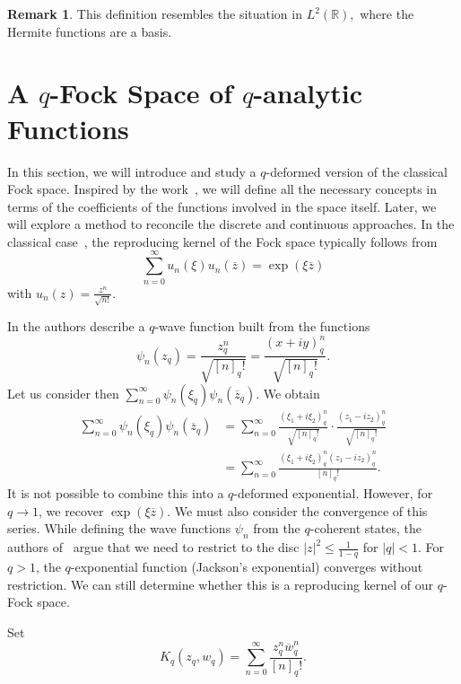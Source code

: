 \documentclass[10pt]{amsart}
\theoremstyle{plain}
\theoremstyle{definition}
\newtheorem{remark}[theorem]{Remark}
\renewcommand{\bar}[1]{\overline{#1}}
\begin{document}
\begin{remark} This definition resembles the situation in $L^2(\mathbb{R}),$ where the Hermite functions are a basis.
\end{remark}


\section{A $q$-Fock Space of $q$-analytic Functions}\label{q-fockspace}

In this section, we will introduce and study a $q$-deformed version of the classical Fock space.
Inspired by the work~\cite{ADDM}, we will define all the necessary concepts in terms of the coefficients of the functions involved in the space itself. Later, we will explore a method to reconcile the discrete and continuous approaches.
In the classical case~\cite{ADDM}, the reproducing kernel of the Fock space typically follows from
$$\sum_{n=0}^{\infty} u_n(\xi)u_n(\bar{z}) = \exp(\xi\bar{z})
$$
with $u_n(z) = \frac{z^n}{\sqrt{n!}}$.

In \cite{Pashaev2014} the authors describe a $q$-wave function built from the functions
$$
\psi_n(z_{q}) = \frac{z_{q}^{n}}{\sqrt{[n]_q!}}=\frac{(x+iy)_q^n}{\sqrt{[n]_q!}}.
$$
Let us consider then $\sum_{n=0}^{\infty} \psi_n(\xi_{q})\psi_n(\bar{z}_{q})$. We obtain
\begin{align*}
\sum_{n=0}^{\infty} \psi_n(\xi_{q})\psi_n(\bar{z}_{q}) &= \sum_{n=0}^{\infty} \frac{(\xi_1+i\xi_2)_q^n}{\sqrt{[n]_q!}}\cdot \frac{(z_1-iz_2)_q^n}{\sqrt{[n]_q!}}\\
&=\sum_{n=0}^{\infty} \frac{(\xi_1+i\xi_2)_q^n(z_1-iz_2)_q^n}{[n]_q!}.
\end{align*}
It is not possible to combine this into a $q$-deformed exponential. However, for $q \rightarrow 1$, we recover $\exp(\xi\bar{z})$. We must also consider the convergence of this series. While defining the wave functions $\psi_n$ from the $q$-coherent states, the authors of~\cite{Pashaev2014} argue that we need to restrict to the disc $\vert z \vert^2 \leq \frac{1}{1-q}$ for $\vert q \vert < 1$. For $q > 1$, the $q$-exponential function (Jackson’s exponential) converges without restriction.
We can still determine whether this is a reproducing kernel of our $q$-Fock space. 

Set
\begin{equation*}
K_q(z_{q},w_{q}) = \sum_{n=0}^{\infty} \frac{z_q^n\bar{w}_q^n}{[n]_q!}.
\end{equation*}
\end{document}
